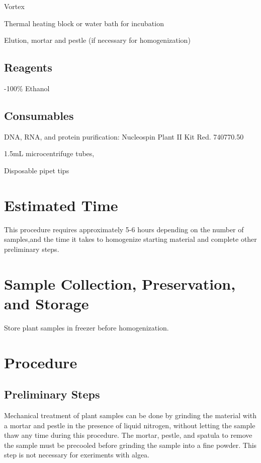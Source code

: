 \documentclass[12pt]{../SOP3_alpha}\usepackage[]{graphicx}\usepackage[]{color}
\begin{document}
\NP Vortex

\NP Thermal heating block or water bath for incubation

\NP Elution, mortar and pestle (if necessary for homogenization)

\subsection*{Reagents}

-100\% Ethanol 

\subsection*{Consumables}

\NP DNA, RNA, and protein purification: Nucleospin Plant II Kit Red. 740770.50

\NP 1.5mL microcentrifuge tubes, 

\NP Disposable pipet tips


\section{Estimated Time}

\NP This procedure requires approximately 5-6 hours depending on the number of samples,and the time it takes to homogenize starting material and complete other preliminary steps. 

\section{Sample Collection, Preservation, and Storage}

\NP Store plant samples in freezer before homogenization.

\section{Procedure}

\subsection*{Preliminary Steps}
	 
\NP Mechanical treatment of plant samples can be done by grinding the material with a mortar and pestle in the presence of liquid nitrogen, without letting the sample thaw any time during this procedure. The mortar, pestle, and spatula to remove the sample must be precooled before grinding the sample into a fine powder. This step is not necessary for exeriments with algea.
\end{document}
